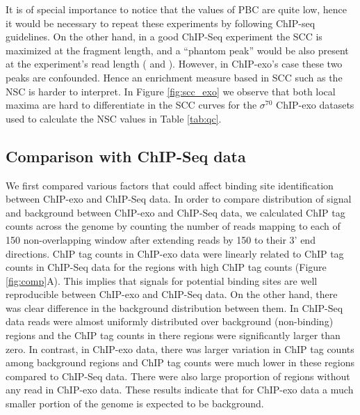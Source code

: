 \documentclass{bmcart}\usepackage[]{graphicx}\usepackage[]{color}
\newcommand{\sig}{\sigma^{70}}
\begin{document}
It is of special importance to notice that the values of PBC are quite
low, hence it would be necessary to repeat these experiments by
following ChIP-seq guidelines. On the other hand, in a good ChIP-Seq
experiment the SCC is maximized at the fragment length, and a
``phantom peak'' would be also present at the experiment's read length
(\cite{encode_qc} and \cite{strandcc}). However, in ChIP-exo's case
these two peaks are confounded. Hence an enrichment measure based in
SCC such as the NSC is harder to interpret. In Figure
\ref{fig:scc_exo} we observe that both local maxima are hard to
differentiate in the SCC curves for the $\sig$ ChIP-exo datasets used to
calculate the NSC values in Table \ref{tab:qc}.



\subsection{Comparison with ChIP-Seq data}



We first compared various factors that could affect binding site
identification between ChIP-exo and ChIP-Seq data. In order to compare
distribution of signal and background between ChIP-exo and ChIP-Seq
data, we calculated ChIP tag counts across the genome by counting the
number of reads mapping to each of 150 non-overlapping
window after extending reads by 150 to their 3' end
directions. ChIP tag counts in ChIP-exo data were linearly related to
ChIP tag counts in ChIP-Seq data for the regions with high ChIP tag
counts (Figure \ref{fig:comp}A). This implies that signals for
potential binding sites are well reproducible between ChIP-exo and
ChIP-Seq data. On the other hand, there was clear difference in the
background distribution between them. In ChIP-Seq data reads were
almost uniformly distributed over background (non-binding) regions and
the ChIP tag counts in there regions were significantly larger than
zero. In contrast, in ChIP-exo data, there was larger variation in
ChIP tag counts among background regions and ChIP tag counts were much
lower in these regions compared to ChIP-Seq data. There were also
large proportion of regions without any read in ChIP-exo data. These
results indicate that for ChIP-exo data a much smaller portion of the
genome is expected to be background.
\end{document}
